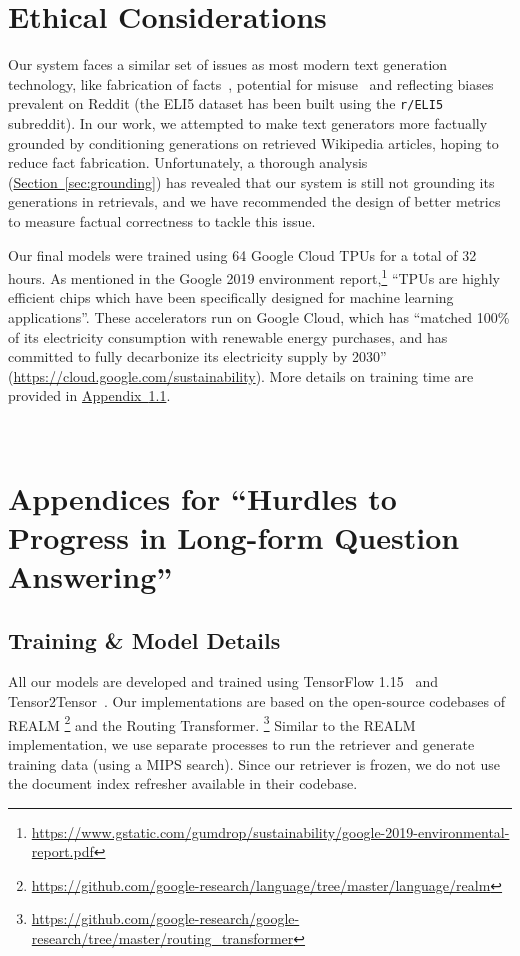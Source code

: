 \documentclass[11pt]{article}
\newcommand{\namedref}[2]{\hyperref[#2]{#1~\ref*{#2}}}
\newcommand{\sectionref}[1]{\namedref{Section}{#1}}
\newcommand{\appendixref}[1]{\namedref{Appendix}{#1}}
\begin{document}
\section*{Ethical Considerations}

Our system faces a similar set of issues as most modern text generation technology, like fabrication of facts~\citep{zellers2019defending}, potential for misuse~\citep{brown2020language} and reflecting biases prevalent on Reddit (the ELI5 dataset has been built using the \texttt{r/ELI5} subreddit). In our work, we attempted to make text generators more factually grounded by conditioning generations on retrieved Wikipedia articles, hoping to reduce fact fabrication. Unfortunately, a thorough analysis (\sectionref{sec:grounding}) has revealed that our system is still not grounding its generations in retrievals, and we have recommended the design of better metrics to measure factual correctness to tackle this issue.

Our final models were trained using 64 Google Cloud TPUs for a total of 32 hours. As mentioned in the Google 2019 environment report,\footnote{\url{https://www.gstatic.com/gumdrop/sustainability/google-2019-environmental-report.pdf}} ``TPUs are highly efficient chips which have been specifically designed for machine learning applications''. These accelerators run on Google Cloud, which has ``matched 100\% of its electricity consumption with renewable energy purchases, and has committed to fully decarbonize its electricity supply by 2030'' (\url{https://cloud.google.com/sustainability}).
More details on training time are provided in \appendixref{appendix:training_model}. 

\newpage
~
\newpage
\appendix

\section{Appendices for ``Hurdles to Progress in Long-form Question Answering''}
\label{sec:appendix}

\subsection{Training \& Model Details}
\label{appendix:training_model}

All our models are developed and trained using TensorFlow 1.15~\citep{abadi2016tensorflow} and Tensor2Tensor~\citep{tensor2tensor}. Our implementations are based on the open-source codebases of REALM \footnote{\url{https://github.com/google-research/language/tree/master/language/realm}} and the Routing Transformer. \footnote{\url{https://github.com/google-research/google-research/tree/master/routing_transformer}} Similar to the REALM implementation, we use separate processes to run the retriever and generate training data (using a MIPS search). Since our retriever is frozen, we do not use the document index refresher available in their codebase.\\
\end{document}
